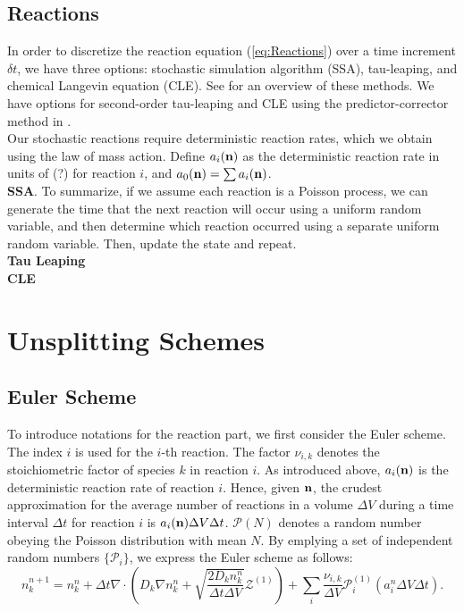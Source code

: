 \documentclass[final]{siamltex}
\def\nb  {{\bf n}}
\def\mZb {\bm{\mathcal{Z}}}
\def\mPb {\bm{\mathcal{P}}}
\begin{document}
\subsection{Reactions}
In order to discretize the reaction equation (\ref{eq:Reactions}) over a time
increment $\delta t$, we have three options: stochastic
simulation algorithm (SSA), tau-leaping, and chemical Langevin equation (CLE).
See \cite{Gillespie2007} for an overview of these methods.  We have options
for second-order tau-leaping and CLE using the predictor-corrector
method in \cite{AndersonMattingly2011}.\\

Our stochastic reactions require deterministic reaction rates, which we obtain
using the law of mass action.  Define $a_i(\nb)$ as the deterministic reaction
rate in units of (?) for reaction $i$, and $a_0(\nb) = \sum a_i(\nb)$.\\

{\bf SSA}.  To summarize, if we assume each reaction is a Poisson process, we
can generate the time that the next reaction will occur using a uniform random
variable, and then determine which reaction occurred using a separate 
uniform random variable.  Then, update the state and repeat.\\

{\bf Tau Leaping}\\

{\bf CLE}

\section{Unsplitting Schemes}

\subsection{Euler Scheme}

To introduce notations for the reaction part, we first consider the Euler scheme.
The index $i$ is used for the $i$-th reaction.
The factor $\nu_{i,k}$ denotes the stoichiometric factor of species $k$ in reaction $i$.
As introduced above, $a_i(\nb)$ is the deterministic reaction rate of reaction $i$.
Hence, given $\nb$, the crudest approximation for the average number of reactions 
in a volume $\Delta V$ during a time interval $\Delta t$ for reaction $i$ is
$a_i(\nb)\Delta V\Delta t$.
$\mPb(N)$ denotes a random number obeying the Poisson distribution with mean $N$.
By emplying a set of independent random numbers $\{\mPb_i\}$, we express the Euler scheme as follows:
\begin{equation}
n_k^{n+1} = n_k^n + \Delta t \nabla\cdot\left(D_k \nabla n_k^n
+ \sqrt{\frac{2 D_k n_k^n}{\Delta t\Delta V}}\mZb^{(1)}\right)
+\sum_i \frac{\nu_{i,k}}{\Delta V}\mPb^{(1)}_i\left(a_i^n\Delta V\Delta t\right).
\end{equation}
\end{document}
